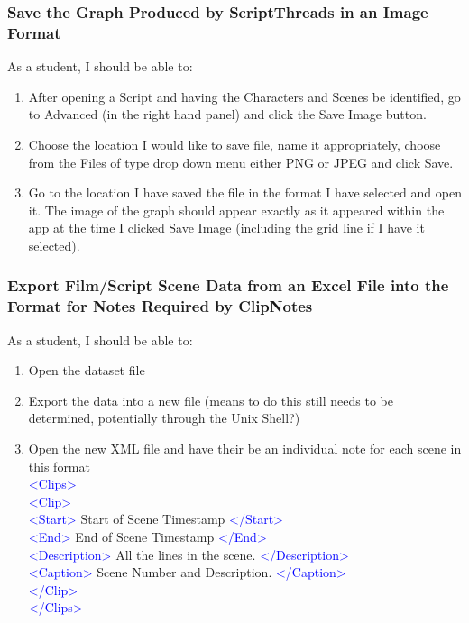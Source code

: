 \documentclass{article}
\begin{document}
\subsubsection{Save the Graph Produced by ScriptThreads in an Image Format}
As a student, I should be able to:
\begin{enumerate}
    \item After opening a Script and having the Characters and Scenes be identified, go to Advanced (in the right hand panel) and click the Save Image button.
    \item Choose the location I would like to save file, name it appropriately, choose from the Files of type drop down menu either PNG or JPEG and click Save.
    \item Go to the location I have saved the file in the format I have selected and open it. The image of the graph should appear exactly as it appeared within the app at the time I clicked Save Image (including the grid line if I have it selected).
\end{enumerate}

\subsubsection{Export Film/Script Scene Data from an Excel File into the Format for Notes Required by ClipNotes}
As a student, I should be able to:
\begin{enumerate}
    \item Open the dataset file
    \item Export the data into a new file (means to do this still needs to be determined, potentially through the Unix Shell?)
    \item Open the new XML file and have their be an individual note for each scene in this format\\
    \textcolor{blue}{\textless Clips\textgreater}\\
    \textcolor{blue}{\textless Clip\textgreater}\\
    \textcolor{blue}{\textless Start\textgreater} Start of Scene Timestamp \textcolor{blue}{\textless /Start\textgreater}\\
    \textcolor{blue}{\textless End\textgreater} End of Scene Timestamp \textcolor{blue}{\textless /End\textgreater}\\
    \textcolor{blue}{\textless Description\textgreater} All the lines in the scene. \textcolor{blue}{\textless/Description\textgreater}\\
    \textcolor{blue}{\textless Caption\textgreater} Scene Number and Description. \textcolor{blue}{\textless /Caption\textgreater}\\
    \textcolor{blue}{\textless /Clip\textgreater}\\
    \textcolor{blue}{\textless /Clips\textgreater}\\
\end{enumerate}
\end{document}
